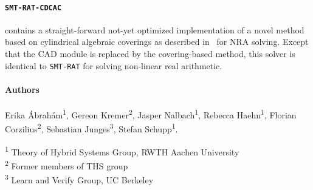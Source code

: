 \documentclass{article}
\begin{document}
\paragraph{\texttt{SMT-RAT-CDCAC}} contains a straight-forward not-yet optimized implementation of a novel method based on cylindrical algebraic coverings as described in~\cite{Abraham2020} for NRA solving. Except that the CAD module is replaced by the covering-based method, this solver is identical to \texttt{SMT-RAT} for solving non-linear real arithmetic.

\paragraph{Authors}

Erika \'Abrah\'am\textsuperscript{1},
Gereon Kremer\textsuperscript{2},
Jasper Nalbach\textsuperscript{1},
Rebecca Haehn\textsuperscript{1},
Florian Corzilius\textsuperscript{2},
Sebastian Junges\textsuperscript{3},
Stefan Schupp\textsuperscript{1}.

\noindent
\textsuperscript{1} Theory of Hybrid Systems Group, RWTH Aachen University \\
\textsuperscript{2} Former members of THS group \\
\textsuperscript{3} Learn and Verify Group, UC Berkeley
\newpage



\end{document}
